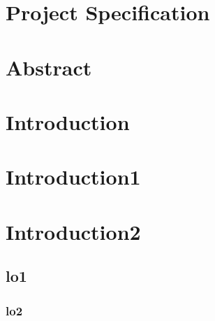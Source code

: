 \documentclass[11pt, letterpaper]{article}            %
\newcommand{\footrulecolor}[1]{\patchcmd{\footrule}{\hrule}{\color{#1}\hrule}{}{}} %
\begin{document}
\section*{Project Specification}
\lipsum[1]
\newpage

\section*{Abstract}
\lipsum[1]
\newpage

\tableofcontents
\thispagestyle{fancy}
\newpage

\fancyfoot{} %
\renewcommand{\footrulewidth}{0.4pt} %
\footrulecolor{linec}

\section{Introduction}
\lipsum[1-5]
\section{Introduction1}
\lipsum[1-5]
\section{Introduction2}
\lipsum[1-5]
\subsection{lo1}
\lipsum[1-4]
\subsubsection{lo2}
\lipsum[1-3]
\end{document}
